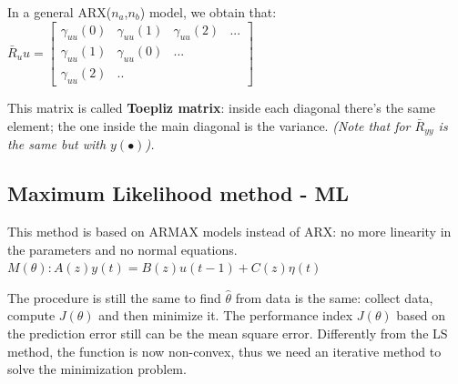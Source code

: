 \documentclass[10pt,a4paper]{article}
\begin{document}
In a general ARX($n_a$,$n_b$) model, we obtain that:
\center
 $\bar{R}_uu= \begin{bmatrix}
\gamma_{uu}(0) & \gamma_{uu}(1) & \gamma_{uu}(2) & ...\\
\gamma_{uu}(1) & \gamma_{uu}(0) & ... \\
\gamma_{uu}(2) & ..
\end{bmatrix}$
\\ \raggedright \vspace{0.5em}
This matrix is called \textbf{Toepliz matrix}: inside each diagonal there's the same element; the one inside the main diagonal is the variance. \textit{(Note that for $\bar{R}_{yy}$ is the same but with $y(\bullet)$).}
\subsection{Maximum Likelihood method - ML}
This method is based on ARMAX models instead of ARX: no more linearity in the parameters and no normal equations. \\
\center $M(\theta): A(z)y(t)=B(z)u(t-1)+C(z)\eta(t)$
\\ \raggedright \vspace{0.3em}
The procedure is still the same to find $\hat{\theta}$ from data is the same: collect data, compute $J(\theta)$ and then minimize it.
The performance index $J(\theta)$ based on the prediction error still can be the mean square error. Differently from the LS method, the function is now non-convex, thus we need an iterative method to solve the minimization problem.
\end{document}
